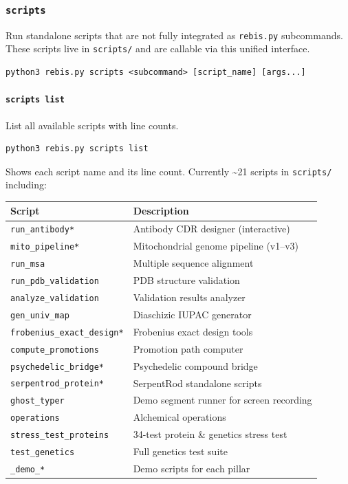 \documentclass[12pt,a4paper]{article}
\begin{document}
\hypertarget{scripts-1}{%
\subsubsection{\texorpdfstring{\texttt{scripts}}{scripts}}\label{scripts-1}}

Run standalone scripts that are not fully integrated as
\texttt{rebis.py} subcommands. These scripts live in \texttt{scripts/}
and are callable via this unified interface.

\begin{verbatim}
python3 rebis.py scripts <subcommand> [script_name] [args...]
\end{verbatim}

\hypertarget{scripts-list}{%
\paragraph{\texorpdfstring{\texttt{scripts\ list}}{scripts list}}\label{scripts-list}}

List all available scripts with line counts.

\begin{verbatim}
python3 rebis.py scripts list
\end{verbatim}

Shows each script name and its line count. Currently \textasciitilde21
scripts in \texttt{scripts/} including:

\begin{longtable}[]{@{}ll@{}}
\toprule
Script & Description\tabularnewline
\midrule
\endhead
\texttt{run\_antibody*} & Antibody CDR designer
(interactive)\tabularnewline
\texttt{mito\_pipeline*} & Mitochondrial genome pipeline
(v1--v3)\tabularnewline
\texttt{run\_msa} & Multiple sequence alignment\tabularnewline
\texttt{run\_pdb\_validation} & PDB structure validation\tabularnewline
\texttt{analyze\_validation} & Validation results
analyzer\tabularnewline
\texttt{gen\_univ\_map} & Diaschizic IUPAC generator\tabularnewline
\texttt{frobenius\_exact\_design*} & Frobenius exact design
tools\tabularnewline
\texttt{compute\_promotions} & Promotion path computer\tabularnewline
\texttt{psychedelic\_bridge*} & Psychedelic compound
bridge\tabularnewline
\texttt{serpentrod\_protein*} & SerpentRod standalone
scripts\tabularnewline
\texttt{ghost\_typer} & Demo segment runner for screen
recording\tabularnewline
\texttt{operations} & Alchemical operations\tabularnewline
\texttt{stress\_test\_proteins} & 34-test protein \& genetics stress
test\tabularnewline
\texttt{test\_genetics} & Full genetics test suite\tabularnewline
\texttt{\_demo\_*} & Demo scripts for each pillar\tabularnewline
\bottomrule
\end{longtable}
\end{document}
